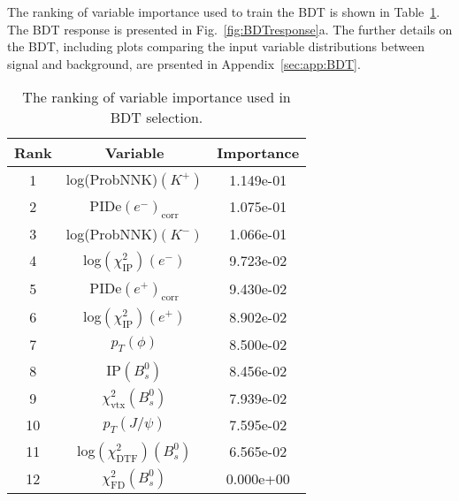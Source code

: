   The ranking of variable importance used to train the BDT is shown in Table~\ref{tab:RankingBDT}. The BDT response is presented in Fig.~\ref{fig:BDTresponse}a. The further details on the BDT, including plots comparing the input variable distributions between signal and background, are prsented in  Appendix~\ref{sec:app:BDT}. 
   \begin{table}[hbt]
  \caption{
    The ranking of variable importance used in BDT selection.
}
    \small{
\begin{center} \begin{tabular}{ccc}
    \hline
   Rank&Variable & Importance  \\
    \hline
  1&log(ProbNNK)$(K^{+})$ & 1.149e-01 \\
  2&PIDe$(e^{-})_{\text{corr}}$ & 1.075e-01 \\
  3&log(ProbNNK)$(K^{-})$ & 1.066e-01 \\
  4&log$(\chi^{2}_{\text{IP}})(e^{-})$ & 9.723e-02 \\
  5&PIDe$(e^{+})_{\text{corr}}$ & 9.430e-02 \\
  6&log$(\chi^{2}_{\text{IP}})(e^{+})$ & 8.902e-02 \\
  7&$p_{T}(\phi)$ & 8.500e-02 \\
  8&IP$(B^{0}_{s})$ & 8.456e-02 \\
  9&$\chi^{2}_{\text{vtx}}(B^{0}_{s})$ & 7.939e-02 \\
  10&$p_{T}(J/\psi)$ & 7.595e-02 \\
  11&log$(\chi^{2}_{\text{DTF}})(B^{0}_{s})$ & 6.565e-02 \\
  12&$\chi^{2}_{\text{FD}}(B^{0}_{s})$ & 0.000e+00 \\
  \hline
    \end{tabular}\end{center}
  }
\label{tab:RankingBDT}
\end{table}

